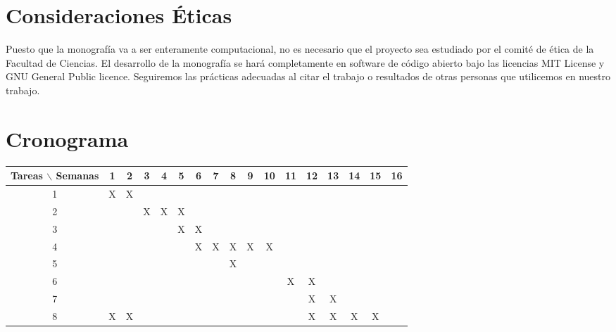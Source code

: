 \documentclass[12pt]{article}
\begin{document}
\section{Consideraciones \'Eticas}

Puesto que la monografía va a ser enteramente computacional, no es
necesario que el proyecto sea estudiado por el comité de ética de la
Facultad de Ciencias. El desarrollo de la monografía se hará completamente en software de código abierto bajo las licencias MIT License y GNU General Public licence.
Seguiremos las pr\'acticas adecuadas al citar el trabajo o resultados
de otras personas que utilicemos en nuestro trabajo.   



\section{Cronograma}

\begin{table}[htb]
	\begin{tabular}{|c|cccccccccccccccc| }
	\hline
	Tareas $\backslash$ Semanas & 1 & 2 & 3 & 4 & 5 & 6 & 7 & 8 & 9 & 10 & 11 & 12 & 13 & 14 & 15 & 16  \\
	\hline
	1 & X & X &   &    &   &   &   &   &   &   &   &   &   &   &   &   \\
	2 &   &   & X &  X & X &   &   &   &   &   &   &   &   &   &   &   \\
	3 &   &   &   &    & X &  X &  &  &   &   &   &   &   &   &   &   \\
	4 &   &   &   &    &   &   X & X & X & X & X &   &   &   &   &   &   \\
    5 &   &   &   &    &   &     &   & X &   &   &   &   &   &   &   &   \\
	6 &   &   &   &   &  &   &   &   &  &   &  X & X &   &   &  &   \\
     7 &   &   &   &   &  &   &   &   &  &   &   &  X &  X &   &  &   \\
    8 & X  &  X &   &   &  &   &   &   &   &   &   &  X&  X &  X &  X&   \\
	\hline
	\end{tabular}
\end{table}
\vspace{1mm}
\end{document}
